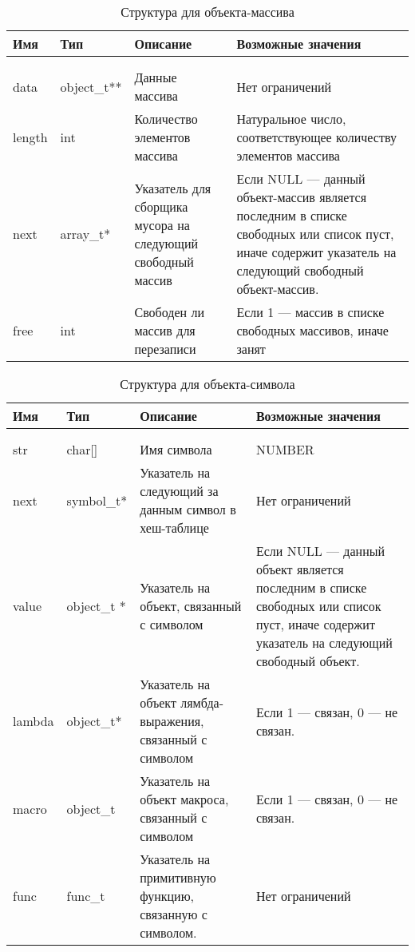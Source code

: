 \begin{xltabular}{\textwidth}{|l|l|p{5.7cm}|X|}
	\caption{Структура  для объекта-массива\label{strobjarr:table}}\\ \hline
	\centrow Имя & \centrow Тип & \centrow Описание & \centrow Возможные значения \\ \hline
	 &  &  &  \\ \hline
	\endfirsthead
	 &  &  &  \\ \hline
	\finishhead
	data & object\_t** & Данные массива & Нет ограничений \\ \hline 
	length & int & Количество элементов массива & Натуральное число, соответствующее количеству элементов массива \\ \hline 
	next & array\_t* & Указатель для сборщика мусора на следующий свободный массив & Если NULL — данный объект-массив является последним в списке свободных или список пуст, иначе содержит указатель на следующий свободный объект-массив. \\ \hline 
	free & int & Свободен ли массив для перезаписи & Если 1 — массив в списке свободных массивов, иначе занят
\end{xltabular}

\begin{xltabular}{\textwidth}{|l|l|p{5.7cm}|X|}
	\caption{Структура  для объекта-символа\label{strobjsym:table}}\\ \hline
	\centrow Имя & \centrow Тип & \centrow Описание & \centrow Возможные значения \\ \hline
	 &  &  &  \\ \hline
	\endfirsthead
	 &  &  &  \\ \hline
	\finishhead
	str & char[] & Имя символа & NUMBER \\ \hline 
	next & symbol\_t* & Указатель на следующий за данным символ в хеш-таблице & Нет ограничений \\ \hline 
	value & object\_t * & Указатель на объект, связанный с символом & Если NULL — данный объект является последним в списке свободных или список пуст, иначе содержит указатель на следующий свободный объект. \\ \hline 
	lambda & object\_t* & Указатель на объект лямбда-выражения, связанный с символом & Если 1 — связан, 0 — не связан. \\ \hline
	macro & object\_t & Указатель на объект макроса, связанный с символом & Если 1 — связан, 0 — не связан. \\ \hline
	func & func\_t & Указатель на примитивную функцию, связанную с символом. & Нет ограничений
\end{xltabular}

